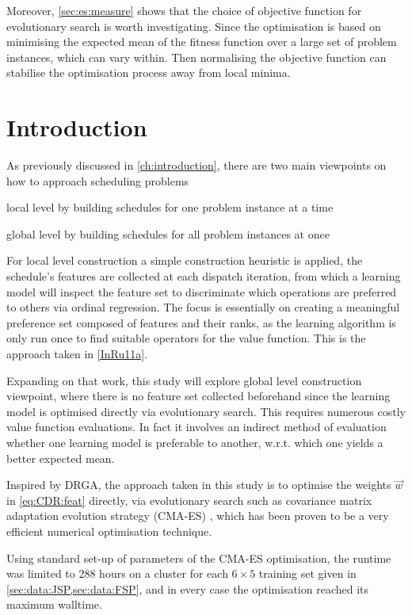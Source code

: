 Moreover, \cref{sec:es:measure} shows that the choice of objective function  for evolutionary search is worth investigating. Since the optimisation is based on minimising the expected mean of the fitness function over a large set of problem instances, which can vary within. Then normalising the objective function can stabilise the optimisation process away from local minima. 

\section{Introduction}
As previously discussed in \cref{ch:introduction}, there are two main 
viewpoints on how to approach scheduling problems
\begin{enumerate*}
	\item local level by building schedules for one problem instance at a time
    \item global level by building schedules for all problem instances at once
\end{enumerate*}
{For local level construction a simple construction heuristic is applied, 
the schedule's features are collected at each dispatch iteration, from which a 
learning model will inspect the feature set to discriminate which operations 
are preferred to others via ordinal regression. The focus is essentially on 
creating a meaningful preference set composed of features and their ranks, as 
the learning algorithm is only run once to find suitable operators for the 
value function. This is the approach taken in \cref{InRu11a}.} 

Expanding on 
that  work, this study will explore global level construction viewpoint, where 
there is no feature set collected beforehand since the learning model is 
optimised directly via evolutionary search. This requires numerous costly value 
function evaluations. In fact it involves an indirect method of evaluation 
whether one learning model is preferable to another, w.r.t. which one yields a 
better expected mean. 



Inspired by DRGA, the approach taken in this study is to optimise the weights 
$\vec{w}$ in \cref{eq:CDR:feat} directly, via evolutionary search such as 
covariance matrix adaptation evolution strategy (CMA-ES) \cite{Hansen01}, which 
has been proven to be a very efficient numerical optimisation technique. 

Using standard set-up of parameters of the CMA-ES optimisation, the runtime was limited to 288 hours on a cluster for each $6\times5$ training set given in \cref{sec:data:JSP,sec:data:FSP}, and in every case the optimisation reached its maximum walltime.

